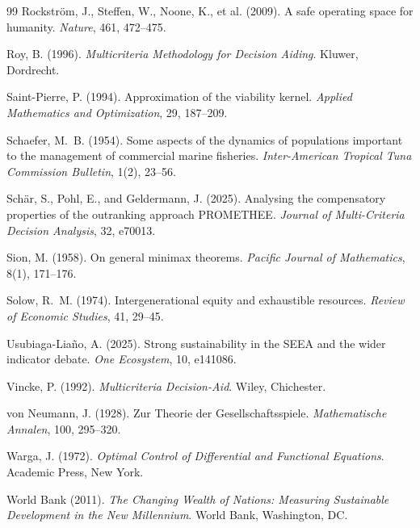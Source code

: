 \begin{thebibliography}{99}
 Rockstr\"om, J., Steffen, W., Noone, K., et al. (2009). A safe operating space for humanity. \emph{Nature}, 461, 472--475.

 Roy, B. (1996). \emph{Multicriteria Methodology for Decision Aiding}. Kluwer, Dordrecht.

 Saint-Pierre, P. (1994). Approximation of the viability kernel. \emph{Applied Mathematics and Optimization}, 29, 187--209.

 Schaefer, M.~B. (1954). Some aspects of the dynamics of populations important to the management of commercial marine fisheries. \emph{Inter-American Tropical Tuna Commission Bulletin}, 1(2), 23--56.

 Sch\"ar, S., Pohl, E., and Geldermann, J. (2025). Analysing the compensatory properties of the outranking approach PROMETHEE. \emph{Journal of Multi-Criteria Decision Analysis}, 32, e70013.

 Sion, M. (1958). On general minimax theorems. \emph{Pacific Journal of Mathematics}, 8(1), 171--176.

 Solow, R.~M. (1974). Intergenerational equity and exhaustible resources. \emph{Review of Economic Studies}, 41, 29--45.

 Usubiaga-Lia\~no, A. (2025). Strong sustainability in the SEEA and the wider indicator debate. \emph{One Ecosystem}, 10, e141086.

 Vincke, P. (1992). \emph{Multicriteria Decision-Aid}. Wiley, Chichester.

 von Neumann, J. (1928). Zur Theorie der Gesellschaftsspiele. \emph{Mathematische Annalen}, 100, 295--320.

 Warga, J. (1972). \emph{Optimal Control of Differential and Functional Equations}. Academic Press, New York.

 World Bank (2011). \emph{The Changing Wealth of Nations: Measuring Sustainable Development in the New Millennium}. World Bank, Washington, DC.

\end{thebibliography}


